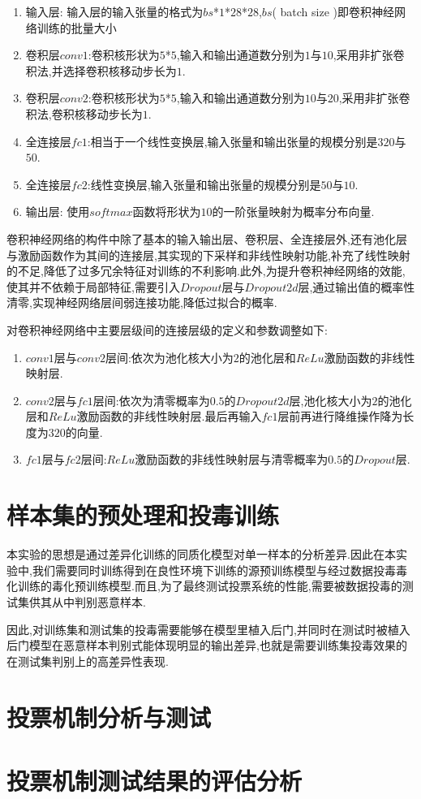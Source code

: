 \begin{enumerate}
	\item 输入层: 输入层的输入张量的格式为$bs$*$1$*$28$*$28$,$bs$( batch size )即卷积神经网络训练的批量大小
	\item 卷积层$conv1$:卷积核形状为$5$*$5$,输入和输出通道数分别为$1$与$10$,采用非扩张卷积法,并选择卷积核移动步长为$1$.
	\item 卷积层$conv2$:卷积核形状为$5$*$5$,输入和输出通道数分别为$10$与$20$,采用非扩张卷积法,卷积核移动步长为$1$.
	\item 全连接层$fc1$:相当于一个线性变换层,输入张量和输出张量的规模分别是$320$与$50$.
	\item 全连接层$fc2$:线性变换层,输入张量和输出张量的规模分别是$50$与$10$.
	\item 输出层: 使用$softmax$函数将形状为$10$的一阶张量映射为概率分布向量.
\end{enumerate}

卷积神经网络的构件中除了基本的输入输出层、卷积层、全连接层外,还有池化层与激励函数作为其间的连接层,其实现的下采样和非线性映射功能,补充了线性映射的不足,降低了过多冗余特征对训练的不利影响.此外,为提升卷积神经网络的效能,使其并不依赖于局部特征,需要引入$Dropout$层与$Dropout2d$层,通过输出值的概率性清零,实现神经网络层间弱连接功能,降低过拟合的概率.

对卷积神经网络中主要层级间的连接层级的定义和参数调整如下:

\begin{enumerate}
	\item $conv1$层与$conv2$层间:依次为池化核大小为$2$的池化层和$ReLu$激励函数的非线性映射层.
	\item $conv2$层与$fc1$层间:依次为清零概率为$0.5$的$Dropout2d$层,池化核大小为$2$的池化层和$ReLu$激励函数的非线性映射层.最后再输入$fc1$层前再进行降维操作降为长度为$320$的向量.
	\item $fc1$层与$fc2$层间:$ReLu$激励函数的非线性映射层与清零概率为$0.5$的$Dropout$层.
\end{enumerate}

\section{样本集的预处理和投毒训练}

本实验的思想是通过差异化训练的同质化模型对单一样本的分析差异.因此在本实验中,我们需要同时训练得到在良性环境下训练的源预训练模型与经过数据投毒毒化训练的毒化预训练模型.而且,为了最终测试投票系统的性能,需要被数据投毒的测试集供其从中判别恶意样本.

因此,对训练集和测试集的投毒需要能够在模型里植入后门,并同时在测试时被植入后门模型在恶意样本判别式能体现明显的输出差异,也就是需要训练集投毒效果的在测试集判别上的高差异性表现.



\section{投票机制分析与测试}

\section{投票机制测试结果的评估分析}
